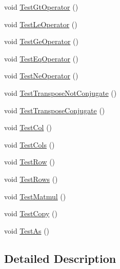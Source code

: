 \begin{DoxyCompactItemize}
\item 
void \mbox{\hyperlink{classkhiva_1_1array_1_1tests_1_1_array_tests_aa7a668cb284bd4721a0b183913b45eac}{Test\+Gt\+Operator}} ()
\item 
void \mbox{\hyperlink{classkhiva_1_1array_1_1tests_1_1_array_tests_ac69848058d55d502015a1a2e9ff03400}{Test\+Le\+Operator}} ()
\item 
void \mbox{\hyperlink{classkhiva_1_1array_1_1tests_1_1_array_tests_aaf0f707196a012805f2250da6ba2d121}{Test\+Ge\+Operator}} ()
\item 
void \mbox{\hyperlink{classkhiva_1_1array_1_1tests_1_1_array_tests_afc905395136caa079d3fa8305b9ef3ba}{Test\+Eq\+Operator}} ()
\item 
void \mbox{\hyperlink{classkhiva_1_1array_1_1tests_1_1_array_tests_ac5410c846c813df349a128009400b88f}{Test\+Ne\+Operator}} ()
\item 
void \mbox{\hyperlink{classkhiva_1_1array_1_1tests_1_1_array_tests_a2b7c7f85909d1c6fbc83692348d31642}{Test\+Transpose\+Not\+Conjugate}} ()
\item 
void \mbox{\hyperlink{classkhiva_1_1array_1_1tests_1_1_array_tests_a96376aa2896b2f16743b4e41d8b4922e}{Test\+Transpose\+Conjugate}} ()
\item 
void \mbox{\hyperlink{classkhiva_1_1array_1_1tests_1_1_array_tests_a7275619291342d730a70edb4e782b1bd}{Test\+Col}} ()
\item 
void \mbox{\hyperlink{classkhiva_1_1array_1_1tests_1_1_array_tests_a79406c424e0cfb8181896970ad2acdd3}{Test\+Cols}} ()
\item 
void \mbox{\hyperlink{classkhiva_1_1array_1_1tests_1_1_array_tests_afdd3625f78cb80ddef17c4b0ac478839}{Test\+Row}} ()
\item 
void \mbox{\hyperlink{classkhiva_1_1array_1_1tests_1_1_array_tests_ab93019b636cc61174e9d4477c495a7a6}{Test\+Rows}} ()
\item 
void \mbox{\hyperlink{classkhiva_1_1array_1_1tests_1_1_array_tests_a3a533534bb44dbd1ed61cc3f9ae0c7d3}{Test\+Matmul}} ()
\item 
void \mbox{\hyperlink{classkhiva_1_1array_1_1tests_1_1_array_tests_af1789d0d096b3a00bbcfb2ca13b00faa}{Test\+Copy}} ()
\item 
void \mbox{\hyperlink{classkhiva_1_1array_1_1tests_1_1_array_tests_a78ff58d5c1409c4d5791b194ff111952}{Test\+As}} ()
\end{DoxyCompactItemize}


\subsection{Detailed Description}


